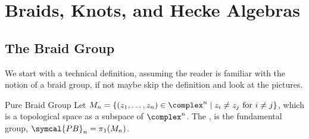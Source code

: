 \documentclass[fleqn]{NotesClass}
\newcommand{\purebraid}{\symcal{PB}}
\begin{document}
    
    \chapter{Braids, Knots, and Hecke Algebras}
    \section{The Braid Group}
    We start with a technical definition, assuming the reader is familiar with the notion of a braid group, if not maybe skip the definition and look at the pictures.
    
    \begin{dfn}{Pure Braid Group}{}
        Let \(M_n = \{(z_1, \dotsc, z_n) \in \complex^n \mid z_i \ne z_j \text{ for } i \ne j\}\), which is a topological space as a subspace of \(\complex^n\).
        The , is the fundamental group, \(\purebraid_n = \pi_1(M_n)\).
    \end{dfn}
    
    
    
    
%	    

    \backmatter
    \renewcommand{\glossaryname}{Acronyms}
    \printglossary[acronym]
    \printindex
\end{document}
